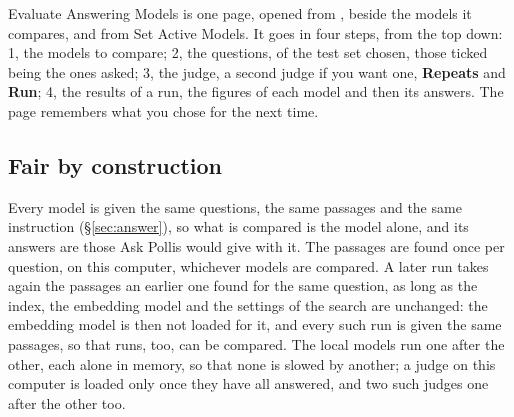 Evaluate Answering Models is one page, opened from , beside the models
it compares, and from Set Active Models. It goes in four steps, from the top
down: 1, the models to compare; 2, the questions, of the test set chosen, those ticked being the ones asked; 3, the
judge, a second judge if you want one, \textbf{Repeats} and \textbf{Run}; 4, the results of a run, the figures of
each model and then its answers. The page remembers what you chose for the next time.

\subsection{Fair by construction}
Every model is given the same questions, the same passages and the same instruction (\S\ref{sec:answer}), so what is
compared is the model alone, and its answers are those Ask Pollis would give with it. The passages are found once per
question, on this computer, whichever models are compared. A later run takes again the passages an earlier one found
for the same question, as long as the index, the embedding model and the settings of the search are unchanged: the
embedding model is then not loaded for it, and every such run is given the same passages, so that runs, too, can be
compared. The local models run one after the other, each alone in
memory, so that none is slowed by another; a judge on this computer is loaded only once they have all answered, and two
such judges one after the other too.

